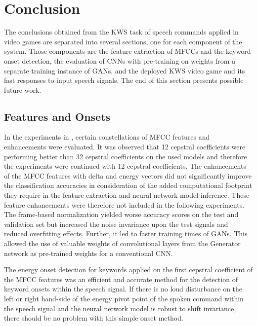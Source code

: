 
\chapter{Conclusion}\label{sec:conclusion}
The conclusions obtained from the KWS task of speech commands applied in video games are separated into several sections, one for each component of the system.
Those components are the feature extraction of MFCCs and the keyword onset detection, the evaluation of CNNs with pre-training on weights from a separate training instance of GANs, and the deployed KWS video game and its fast responses to input speech signals.
The end of this section presents possible future work.



\section{Features and Onsets}
In the experiments in , certain constellations of MFCC features and enhancements were evaluated.
It was observed that 12 cepstral coefficients were performing better than 32 cepstral coefficients on the used models and therefore the experiments were continued with 12 cepstral coefficients.
The enhancements of the MFCC features with delta and energy vectors did not significantly improve the classification accuracies in consideration of the added computational footprint they require in the feature extraction and neural network model inference. 
These feature enhancements were therefore not included in the following experiments.
The frame-based normalization yielded worse accuracy scores on the test and validation set but increased the noise invariance upon the test signals and reduced overfitting effects.
Further, it led to faster training times of GANs.
This allowed the use of valuable weights of convolutional layers from the Generator network as pre-trained weights for a conventional CNN.

The energy onset detection for keywords applied on the first cepstral coefficient of the MFCC features was an efficient and accurate method for the detection of keyword onsets within the speech signal.
If there is no loud disturbance on the left or right hand-side of the energy pivot point of the spoken command within the speech signal and the neural network model is robust to shift invariance, there should be no problem with this simple onset method.



